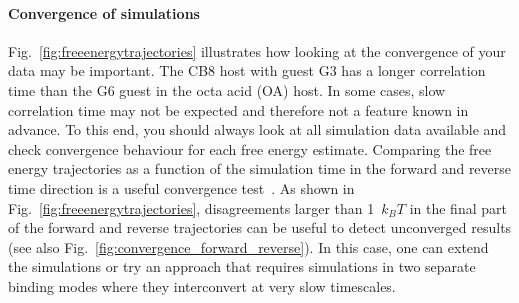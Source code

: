 \documentclass[9pt,bestpractices,pubversion]{livecoms}
\begin{document}
\paragraph{Convergence of simulations}
Fig.~\ref{fig:freeenergytrajectories} illustrates how looking at the convergence of your data may be important. The CB8 host with guest G3 has a longer correlation time than the G6 guest in the octa acid (OA) host. In some cases, slow correlation time may not be expected and therefore not a feature known in advance. To this end, you should always look at all simulation data available and check convergence behaviour for each free energy estimate.
Comparing the free energy trajectories as a function of the simulation time in the forward and reverse time direction is a useful convergence test~\cite{klimovich2015guidelines}.
As shown in Fig.~\ref{fig:freeenergytrajectories}, disagreements larger than 1~$k_{B}T$ in the final part of the forward and reverse trajectories can be useful to detect unconverged results (see also Fig.~\ref{fig:convergence_forward_reverse}).
In this case, one can extend the simulations or try an approach that requires simulations in two separate binding modes where they interconvert at very slow timescales.  
\end{document}
